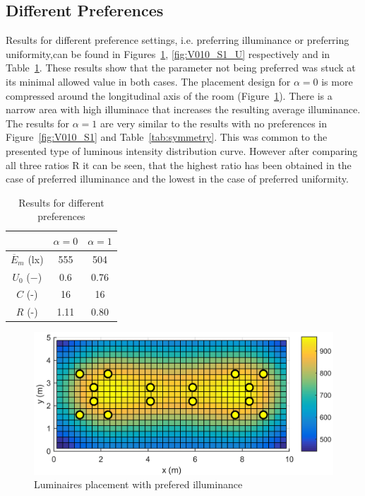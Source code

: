 \subsection{Different Preferences}

Results for different preference settings, i.e. preferring illuminance or preferring uniformity,can be found in Figures~\ref{fig:V010_S1_E}, \ref{fig:V010_S1_U} respectively and in Table~\ref{tab:preferences}. These results show that the parameter not being preferred was stuck at its minimal allowed value in both cases. The placement design for $\alpha = 0$ is more compressed around the longitudinal axis of the room (Figure~\ref{fig:V010_S1_E}). There is a narrow area with high illuminace that increases the resulting average illuminance. The results for $\alpha = 1$ are very similar to the results with no preferences in Figure~\ref{fig:V010_S1} and Table~\ref{tab:symmetry}. This was common to the presented type of luminous intensity distribution curve. However after comparing all three ratios R it can be seen, that the highest ratio has been obtained in the case of preferred illuminance and the lowest in the case of preferred uniformity.

\begin{table}[tb]
	\renewcommand{\arraystretch}{1.8}
	\caption{Results for different preferences}
 	\label{tab:preferences}
	\centering
  \begin{tabular}{| c | c | c |}
    \hline
    & $\alpha = 0$ & $\alpha = 1$ \\
    \hline
    $\overline{E}_{m}$ (lx) & 555 & 504 \\
    \hline
		$U_0$ ($-$)& 0.6 & 0.76 \\
    \hline
		$C$ (-) & 16 & 16 \\
	\hline
		$R$ (-) & 1.11 & 0.80 \\
  \hline
  \end{tabular}
\end{table}

\begin{figure}[tb]
  \centering
  \includegraphics[width=\columnwidth]{../Vysledky/MSTR_SLB_4x18W_5G4_Fit2_E_V010_S1}
  \caption{Luminaires placement with prefered illuminance}
  \label{fig:V010_S1_E}
\end{figure}

